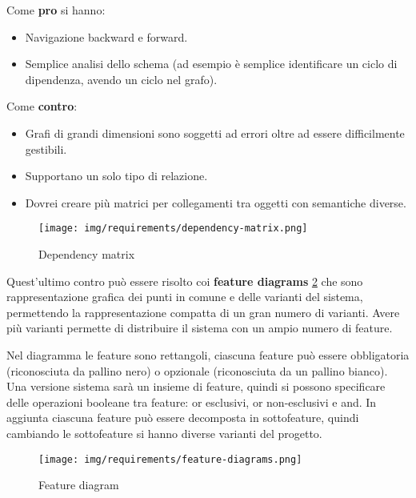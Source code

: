 Come \textbf{pro} si hanno:
\begin{itemize}
      \item Navigazione backward e forward.
      \item Semplice analisi dello schema (ad esempio è semplice identificare un
            ciclo di dipendenza, avendo un ciclo nel grafo).
\end{itemize}

Come \textbf{contro}:
\begin{itemize}
      \item Grafi di grandi dimensioni sono soggetti ad errori oltre ad essere
            difficilmente gestibili.
      \item Supportano un solo tipo di relazione.
      \item Dovrei creare più matrici per collegamenti tra oggetti con semantiche
            diverse.
\end{itemize}
\begin{figure}[!ht]
      \centering
      \texttt{[image: img/requirements/dependency-matrix.png]}
      \caption{Dependency matrix}
      \label{fig:dependency-matrix}
\end{figure}
Quest'ultimo contro può essere risolto coi \textbf{feature diagrams}
\ref{fig:feature-diagram} che sono rappresentazione grafica dei punti in comune
e delle varianti del sistema, permettendo la rappresentazione compatta di un
gran numero di varianti. Avere più varianti permette di distribuire il sistema
con un ampio numero di feature.

Nel diagramma le feature sono rettangoli, ciascuna feature può essere obbligatoria 
(riconosciuta da pallino nero) o opzionale (riconosciuta da un pallino bianco). 
Una versione sistema sarà un insieme di feature, quindi si possono specificare
delle operazioni booleane tra feature: or esclusivi, or non-esclusivi e and.
In aggiunta ciascuna feature può essere decomposta in sottofeature, quindi 
cambiando le sottofeature si hanno diverse varianti del progetto.
\begin{figure}[!ht]
      \centering
      \texttt{[image: img/requirements/feature-diagrams.png]}
      \caption{Feature diagram}
      \label{fig:feature-diagram}
\end{figure}